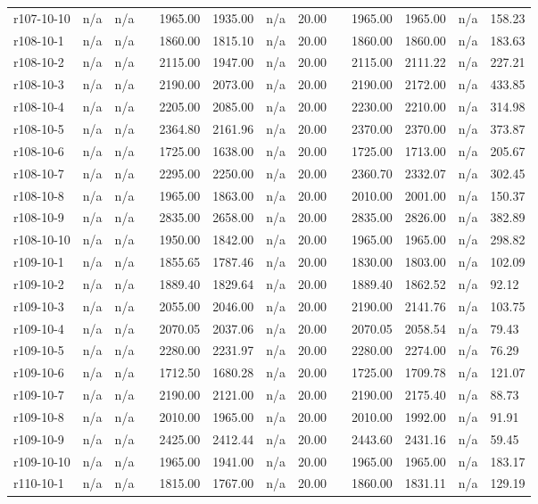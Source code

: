 \documentclass[final,5p,times,twocolumn]{elsarticle}
\begin{document}
{{{{{{{{{{{{{\begin{longtable}{l l l l l l l l l l l l l}
r107-10-10& n/a& n/a&&1965.00& 1935.00& n/a& 20.00&&1965.00& 1965.00& n/a& 158.23\\
r108-10-1& n/a& n/a&&1860.00& 1815.10& n/a& 20.00&&1860.00& 1860.00& n/a& 183.63\\
r108-10-2& n/a& n/a&&2115.00& 1947.00& n/a& 20.00&&2115.00& 2111.22& n/a& 227.21\\
r108-10-3& n/a& n/a&&2190.00& 2073.00& n/a& 20.00&&2190.00& 2172.00& n/a& 433.85\\
r108-10-4& n/a& n/a&&2205.00& 2085.00& n/a& 20.00&&2230.00& 2210.00& n/a& 314.98\\
r108-10-5& n/a& n/a&&2364.80& 2161.96& n/a& 20.00&&2370.00& 2370.00& n/a& 373.87\\
r108-10-6& n/a& n/a&&1725.00& 1638.00& n/a& 20.00&&1725.00& 1713.00& n/a& 205.67\\
r108-10-7& n/a& n/a&&2295.00& 2250.00& n/a& 20.00&&2360.70& 2332.07& n/a& 302.45\\
r108-10-8& n/a& n/a&&1965.00& 1863.00& n/a& 20.00&&2010.00& 2001.00& n/a& 150.37\\
r108-10-9& n/a& n/a&&2835.00& 2658.00& n/a& 20.00&&2835.00& 2826.00& n/a& 382.89\\
r108-10-10& n/a& n/a&&1950.00& 1842.00& n/a& 20.00&&1965.00& 1965.00& n/a& 298.82\\
r109-10-1& n/a& n/a&&1855.65& 1787.46& n/a& 20.00&&1830.00& 1803.00& n/a& 102.09\\
r109-10-2& n/a& n/a&&1889.40& 1829.64& n/a& 20.00&&1889.40& 1862.52& n/a& 92.12\\
r109-10-3& n/a& n/a&&2055.00& 2046.00& n/a& 20.00&&2190.00& 2141.76& n/a& 103.75\\
r109-10-4& n/a& n/a&&2070.05& 2037.06& n/a& 20.00&&2070.05& 2058.54& n/a& 79.43\\
r109-10-5& n/a& n/a&&2280.00& 2231.97& n/a& 20.00&&2280.00& 2274.00& n/a& 76.29\\
r109-10-6& n/a& n/a&&1712.50& 1680.28& n/a& 20.00&&1725.00& 1709.78& n/a& 121.07\\
r109-10-7& n/a& n/a&&2190.00& 2121.00& n/a& 20.00&&2190.00& 2175.40& n/a& 88.73\\
r109-10-8& n/a& n/a&&2010.00& 1965.00& n/a& 20.00&&2010.00& 1992.00& n/a& 91.91\\
r109-10-9& n/a& n/a&&2425.00& 2412.44& n/a& 20.00&&2443.60& 2431.16& n/a& 59.45\\
r109-10-10& n/a& n/a&&1965.00& 1941.00& n/a& 20.00&&1965.00& 1965.00& n/a& 183.17\\
r110-10-1& n/a& n/a&&1815.00& 1767.00& n/a& 20.00&&1860.00& 1831.11& n/a& 129.19\\

\end{longtable}}}}}}}}}}}}}}
\end{document}
